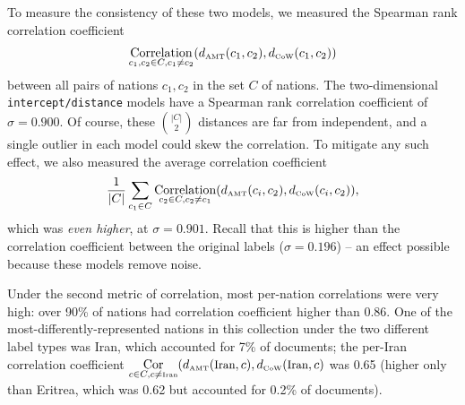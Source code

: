 To measure the consistency of these two models, we measured the
Spearman rank correlation coefficient 
\begin{align*}
\underset{c_1, c_2 \in C, c_1   \neq c_2}
{\operatorname{\mbox{Correlation}}}(d_{\mbox{\tiny AMT}}(c_1, c_2), d_{\mbox{\tiny CoW}}(c_1, c_2))
\end{align*}
between all pairs of nations $c_1, c_2$ in the set $C$ of
nations. The two-dimensional \verb!intercept/distance! models have
a Spearman rank correlation coefficient of $\sigma=0.900$. Of course,
these $|C| \choose{2}$ distances are far from independent, and a
single outlier in each model could skew the correlation.  To mitigate
any such effect, we also measured the average correlation coefficient
\begin{align*}
  \frac{1}{|C|} \sum_{c_1 \in C}
  \underset{c_2 \in C, c_2 \neq c_1}
  {\operatorname{\mbox{Correlation}}}(d_{\mbox{\tiny AMT}}(c_i, c_2), d_{\mbox{\tiny
        CoW}}(c_i, c_2) ),
\end{align*}
which was \emph{even higher}, at $\sigma=0.901$. Recall that this is
higher than the correlation coefficient between the original labels
($\sigma=0.196$) -- an effect possible because these models
remove noise.

Under the second metric of correlation, most per-nation correlations
were very high: over 90\% of nations had correlation coefficient
higher than 0.86.  One of the most-differently-represented nations
in this collection under the two different label types was Iran, which
accounted for 7\% of documents; the per-Iran correlation coefficient
$\underset{c \in C, c \neq \mbox{\tiny Iran}}{\operatorname{\mbox{Cor}}}(d_{\mbox{\tiny AMT}}(\mbox{\small Iran}, c),
d_{\mbox{\tiny CoW}}(\mbox{\small Iran}, c)$ was 0.65 (higher only
than Eritrea, which was 0.62 but accounted for 0.2\% of documents).

